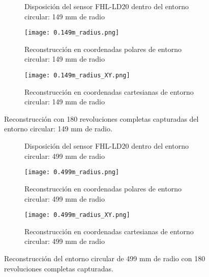 \begin{figure}[H]
	\centering
	\begin{subfigure}{\textwidth}
		\centering
		\caption{Disposición del sensor FHL-LD20 dentro del entorno circular: 149 mm de radio}
		\label{fig:disposicion_lidar_var1}
		\vspace{1em}
	\end{subfigure}
	\begin{subfigure}{0.45\textwidth}
		\centering
		\texttt{[image: 0.149m\_radius.png]}
		\caption{Reconstrucción en coordenadas polares de entorno circular: 149 mm de radio}
		\label{fig:149m_radius_xy}
	\end{subfigure}
	\hspace{1em}
	\begin{subfigure}{0.45\textwidth}
		\centering
		\texttt{[image: 0.149m\_radius\_XY.png]}
		\caption{Reconstrucción en coordenadas cartesianas de entorno circular: 149 mm de radio}
		\label{fig:149m_radius}
	\end{subfigure}
	\caption{Reconstrucción con 180 revoluciones completas capturadas del entorno circular: 149 mm de radio.}
	\label{fig:disposicion_lidar_var_dist1}
\end{figure}

\begin{figure}[H]
	\centering
	\begin{subfigure}{\textwidth}
		\centering
		\caption{Disposición del sensor FHL-LD20 dentro del entorno circular: 499 mm de radio}
		\label{fig:disposicion_lidar_var8}
		\vspace{1em}
	\end{subfigure}
	\begin{subfigure}{0.45\textwidth}
		\centering
		\texttt{[image: 0.499m\_radius.png]}
		\caption{Reconstrucción en coordenadas polares de entorno circular: 499 mm de radio}
		\label{fig:449m_radius_xy}
	\end{subfigure}
	\hspace{1em}
	\begin{subfigure}{0.45\textwidth}
		\centering
		\texttt{[image: 0.499m\_radius\_XY.png]}
		\caption{Reconstrucción en coordenadas cartesianas de entorno circular: 499 mm de radio}
		\label{fig:449m_radius}
	\end{subfigure}
	\caption{Reconstrucción del entorno circular de 499 mm de radio con 180 revoluciones completas capturadas.}
	\label{fig:disposicion_lidar_var_dist8}
\end{figure}

